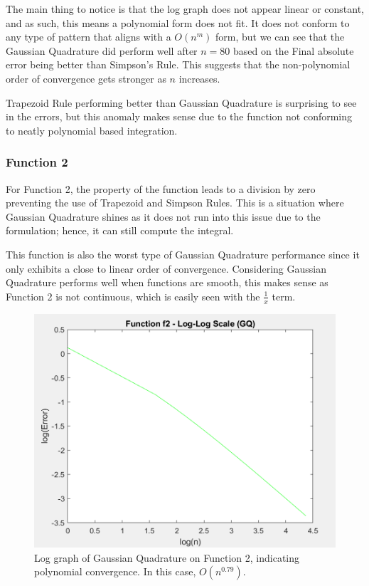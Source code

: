 \documentclass[12pt]{article}
\begin{document}
The main thing to notice is that the log graph does not appear linear or
constant, and as such, this means a polynomial form does not fit. It does not
conform to any type of pattern that aligns with a $O(n^m)$ form, but we can see 
that the Gaussian Quadrature did perform well after $n = 80$ based on the Final
absolute error being better than Simpson's Rule. This suggests that the non-polynomial order of
convergence gets stronger as $n$ increases.

Trapezoid Rule performing better than Gaussian Quadrature is surprising to see 
in the errors, but this anomaly makes sense due to the function not conforming 
to neatly polynomial based integration.

\subsubsection{Function 2}

For Function 2, the property of the function leads to a division by zero 
preventing the use of Trapezoid and Simpson Rules. This is a situation where 
Gaussian Quadrature shines as it does not run into this issue due to the 
formulation; hence, it can still compute the integral. 

This function is also the worst type of Gaussian Quadrature performance since 
it only exhibits a close to linear order of convergence. Considering Gaussian 
Quadrature performs well when functions are smooth, this makes sense as 
Function 2 is not continuous, which is easily seen with the $\frac{1}{x}$ term.

\begin{figure}[htbp]
	\centering
	\begin{minipage}[b]{0.45\textwidth}
		\includegraphics[width=\textwidth]{../images/GQ-f2-logspace.png} %
		\caption{Log graph of Gaussian Quadrature on Function 2, indicating polynomial convergence. In this case, $O(n^{0.79})$.}
	\end{minipage}
\end{figure}
\end{document}
